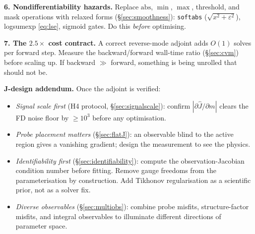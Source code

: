 \documentclass[11pt]{article}
\begin{document}
\noindent\textbf{6. Nondifferentiability hazards.}
Replace $\mathrm{abs}$, $\min$, $\max$, threshold, and mask operations
with relaxed forms (\S\ref{sec:smoothness}): \texttt{softabs} ($\sqrt{x^2
+ \varepsilon^2}$), logsumexp \eqref{eq:lse}, sigmoid gates.  Do this
\emph{before} optimising.

\noindent\textbf{7. The $2.5\times$ cost contract.}
A correct reverse-mode adjoint adds $O(1)$ solves per forward step.
Measure the backward/forward wall-time ratio (\S\ref{sec:cvm}) before
scaling up.  If backward $\gg$ forward, something is being unrolled that
should not be.

\bigskip

\noindent\textbf{J-design addendum.}  Once the adjoint is verified:
\begin{itemize}
\item \emph{Signal scale first} (H4 protocol, \S\ref{sec:signalscale}):
  confirm $|\partial \hat{J}/\partial m|$ clears the FD noise floor by
  $\geq 10^3$ before any optimisation.
\item \emph{Probe placement matters} (\S\ref{sec:flatJ}): an observable
  blind to the active region gives a vanishing gradient; design the
  measurement to see the physics.
\item \emph{Identifiability first} (\S\ref{sec:identifiability}): compute
  the observation-Jacobian condition number before fitting.  Remove gauge
  freedoms from the parameterisation by construction.  Add Tikhonov
  regularisation as a scientific prior, not as a solver fix.
\item \emph{Diverse observables} (\S\ref{sec:multiobs}): combine
  probe misfits, structure-factor misfits, and integral observables to
  illuminate different directions of parameter space.
\end{itemize}
\end{document}
